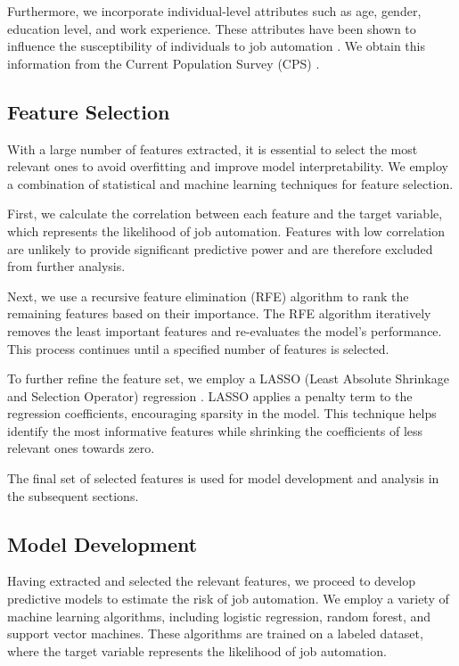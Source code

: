 \documentclass{article}
\begin{document}
Furthermore, we incorporate individual-level attributes such as age, gender, education level, and work experience. These attributes have been shown to influence the susceptibility of individuals to job automation \cite{frey2017future}. We obtain this information from the Current Population Survey (CPS) \cite{cps}.

\subsection{Feature Selection}

With a large number of features extracted, it is essential to select the most relevant ones to avoid overfitting and improve model interpretability. We employ a combination of statistical and machine learning techniques for feature selection.

First, we calculate the correlation between each feature and the target variable, which represents the likelihood of job automation. Features with low correlation are unlikely to provide significant predictive power and are therefore excluded from further analysis.

Next, we use a recursive feature elimination (RFE) algorithm \cite{guyon2002gene} to rank the remaining features based on their importance. The RFE algorithm iteratively removes the least important features and re-evaluates the model's performance. This process continues until a specified number of features is selected.

To further refine the feature set, we employ a LASSO (Least Absolute Shrinkage and Selection Operator) regression \cite{tibshirani1996regression}. LASSO applies a penalty term to the regression coefficients, encouraging sparsity in the model. This technique helps identify the most informative features while shrinking the coefficients of less relevant ones towards zero.

The final set of selected features is used for model development and analysis in the subsequent sections.

\subsection{Model Development}

Having extracted and selected the relevant features, we proceed to develop predictive models to estimate the risk of job automation. We employ a variety of machine learning algorithms, including logistic regression, random forest, and support vector machines. These algorithms are trained on a labeled dataset, where the target variable represents the likelihood of job automation.
\end{document}

